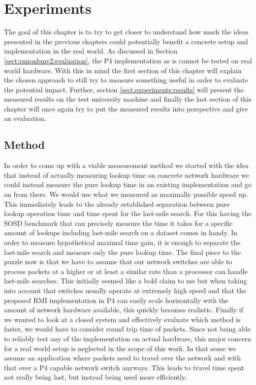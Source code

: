 
\chapter{Experiments}
\label{ch:experiments}
The goal of this chapter is to try to get closer to understand how much the ideas presented in the previous chapters could potentially benefit a concrete setup and implementation in the real world. As discussed in Section \ref{sect:rmionbmv2:evaluation}, the P4 implementation as is cannot be tested on real world hardware. With this in mind the first section of this chapter will explain the chosen approach to still try to measure something useful in order to evaluate the potential impact. Further, section \ref{sect:experiments:results} will present the measured results on the test university machine and finally the last section of this chapter will once again try to put the measured results into perspective and give an evaluation.

\section{Method}
\label{sect:experiments:methods}
In order to come up with a viable measurement method we started with the idea that instead of actually measuring lookup time on concrete network hardware we could instead measure the pure lookup time in an existing implementation and go on from there. We would use what we measured as maximally possible speed up. This immediately leads to the already established separation between pure lookup operation time and time spent for the last-mile search. For this having the SOSD benchmark that can precisely measure the time it takes for a specific amount of lookups including last-mile search on a dataset comes in handy. In order to measure hypothetical maximal time gain, it is enough to separate the last-mile search and measure only the pure lookup time. The final piece to the puzzle now is that we have to assume that our network switches are able to process packets at a higher or at least a similar rate than a processor can handle last-mile searches. This initially seemed like a bold claim to me but when taking into account that switches usually operate at extremely high speed and that the proposed RMI implementation in P4 can easily scale horizontally with the amount of network hardware available, this quickly becomes realistic. Finally if we wanted to look at a closed system and effectively evaluate which method is faster, we would have to consider round trip time of packets. Since not being able to reliably test any of the implementation on actual hardware, this major concern for a real world setup is neglected in the scope of this work. In that sense we assume an application where packets need to travel over the network and with that over a P4 capable network switch anyways. This leads to travel time spent not really being lost, but instead being used more efficiently.

